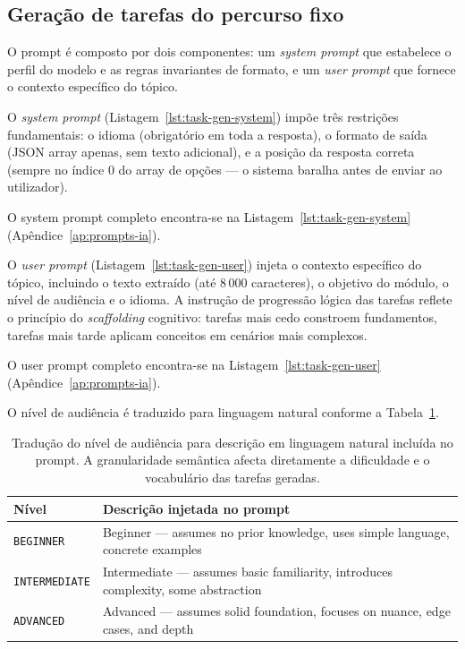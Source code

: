 \subsection{Gera\c{c}\~ao de tarefas do percurso fixo}
\label{ssec:ia-geracao-fixa}

O prompt \'e composto por dois componentes: um \emph{system prompt} que
estabelece o perfil do modelo e as regras invariantes de formato, e um
\emph{user prompt} que fornece o contexto espec\'ifico do t\'opico.

O \emph{system prompt} (Listagem~\ref{lst:task-gen-system}) imp\~oe tr\^es
restri\c{c}\~oes fundamentais: o idioma (obrigat\'orio em toda a resposta),
o formato de sa\'ida (JSON array apenas, sem texto adicional), e a posi\c{c}\~ao
da resposta correta (sempre no \'indice 0 do array de op\c{c}\~oes --- o
sistema baralha antes de enviar ao utilizador).

O system prompt completo encontra-se na Listagem~\ref{lst:task-gen-system}
(Ap\^endice~\ref{ap:prompts-ia}).

O \emph{user prompt} (Listagem~\ref{lst:task-gen-user}) injeta o contexto
espec\'ifico do t\'opico, incluindo o texto extra\'ido (at\'e 8\,000
caracteres), o objetivo do m\'odulo, o n\'ivel de audi\^encia e o idioma.
A instru\c{c}\~ao de progress\~ao l\'ogica das tarefas reflete o princ\'ipio
do \emph{scaffolding} cognitivo: tarefas mais cedo constroem fundamentos,
tarefas mais tarde aplicam conceitos em cen\'arios mais complexos.

O user prompt completo encontra-se na Listagem~\ref{lst:task-gen-user}
(Ap\^endice~\ref{ap:prompts-ia}).

O n\'ivel de audi\^encia \'e traduzido para linguagem natural conforme a
Tabela~\ref{tab:audience-levels}.

\begin{table}[htbp]
	\centering
	\small
	\begin{tabular}{p{2.8cm} p{9.5cm}}
		\toprule
		\textbf{N\'ivel} & \textbf{Descri\c{c}\~ao injetada no prompt} \\
		\midrule
		\texttt{BEGINNER} &
			Beginner --- assumes no prior knowledge, uses simple language, concrete examples \\
		\texttt{INTERMEDIATE} &
			Intermediate --- assumes basic familiarity, introduces complexity, some abstraction \\
		\texttt{ADVANCED} &
			Advanced --- assumes solid foundation, focuses on nuance, edge cases, and depth \\
		\bottomrule
	\end{tabular}
	\caption[Mapeamento de n\'ivel de audi\^encia para descri\c{c}\~ao no prompt]{Tradu\c{c}\~ao do n\'ivel de audi\^encia para descri\c{c}\~ao em linguagem natural inclu\'ida no prompt. A granularidade sem\^antica afecta diretamente a dificuldade e o vocabul\'ario das tarefas geradas.}
	\label{tab:audience-levels}
\end{table}

